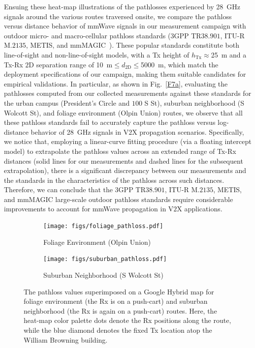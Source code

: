 \documentclass[12pt, draftcls, onecolumn]{IEEEtran}
\begin{document}
{Ensuing these heat-map illustrations of the pathlosses experienced by \SI{28}{\giga\hertz} signals around the various routes traversed onsite, we compare the pathloss versus distance behavior of mmWave signals in our measurement campaign with outdoor micro- and macro-cellular pathloss standards ($3$GPP TR$38.901$, ITU-R M$.2135$, METIS, and mmMAGIC~\cite{MacCartneyModelsOverview}). These popular standards constitute both line-of-sight and non-line-of-sight models, with a Tx height of $h_{\text{Tx}}{\approx}$\SI{25}{\meter} and a Tx-Rx $2$D separation range of \SI{10}{\meter}${\leq}d_{2\text{D}}{\leq}$\SI{5000}{\meter}, which match the deployment specifications of our campaign, making them suitable candidates for empirical validations. In particular, as shown in Fig.~\ref{F7a}, evaluating the pathlosses computed from our collected measurements against these standards for the urban campus (President's Circle and $100$ S St), suburban neighborhood (S Wolcott St), and foliage environment (Olpin Union) routes, we observe that all these pathloss standards fail to accurately capture the pathloss versus log-distance behavior of \SI{28}{\giga\hertz} signals in V$2$X propagation scenarios. Specifically, we notice that, employing a linear-curve fitting procedure (via a floating intercept model) to extrapolate the pathloss values across an extended range of Tx-Rx distances (solid lines for our measurements and dashed lines for the subsequent extrapolation), there is a significant discrepancy between our measurements and the standards in the characteristics of the pathloss across such distances. Therefore, we can conclude that the $3$GPP TR$38.901$, ITU-R M$.2135$, METIS, and mmMAGIC large-scale outdoor pathloss standards require considerable improvements to account for mmWave propagation in V$2$X applications.
\begin{figure} [t]
    \centering
    \begin{subfigure}{0.557\linewidth}
        \centering
        \texttt{[image: figs/foliage\_pathloss.pdf]}
        \caption{Foliage Environment (Olpin Union)}
        \label{F6a}
    \end{subfigure}
    \begin{subfigure}{0.433\linewidth}
        \centering
        \texttt{[image: figs/suburban\_pathloss.pdf]}
        \caption{Suburban Neighborhood (S Wolcott St)}
        \label{F6b}
    \end{subfigure}
    \vspace{-8mm}
    \caption{The pathloss values superimposed on a Google Hybrid map for foliage environment (the Rx is on a push-cart) and suburban neighborhood (the Rx is again on a push-cart) routes. Here, the heat-map color palette dots denote the Rx positions along the route, while the blue diamond denotes the fixed Tx location atop the William Browning building.}
    \label{F6}
\end{figure}

}
\end{document}

